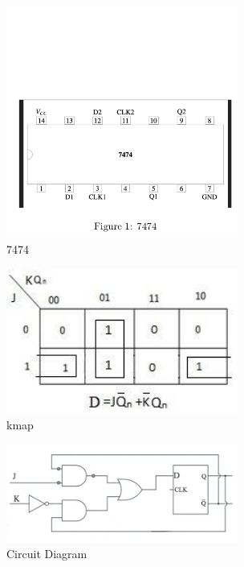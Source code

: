 \documentclass[jornal,10pt,twocolumn]{article}
\begin{document}
\begin{figure}
	\centering																	   		
	\includegraphics[width=3in]{IC.png}
	\caption{7474}
	\label{fig:circuit}	
\end{figure}
\begin{figure}
	\centering
	\includegraphics[width=3in]{kmap.jpeg}
	\caption{kmap}
	\label{fig:circuit}
\end{figure}



\begin{figure}
	\centering
	\includegraphics[width=3in]{flip.jpg}
	\caption{Circuit Diagram}

\end{figure}
\end{document}
